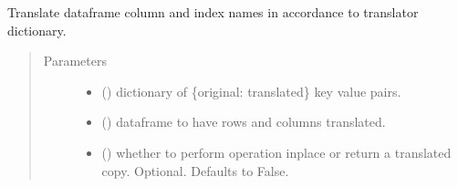 \documentclass[letterpaper,10pt,english]{sphinxmanual}
\begin{document}
\begin{fulllineitems}
Translate dataframe column and index names in accordance to translator
dictionary.
\begin{quote}\begin{description}
\item[{Parameters}] \leavevmode\begin{itemize}
\item {} 
 () \textendash{} dictionary of \{original: translated\} key value
pairs.

\item {} 
 () \textendash{} dataframe to have rows and columns translated.

\item {} 
 () \textendash{} whether to perform operation inplace or return a
translated copy. Optional. Defaults to False.

\end{itemize}

\end{description}\end{quote}

\end{fulllineitems}

\end{document}

